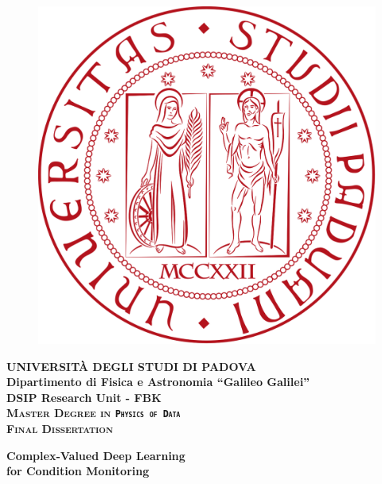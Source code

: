 \documentclass[../main.tex]{subfiles}
\begin{document}
	\begin{titlepage}
		\vspace{5mm}
		\begin{figure}[hbtp]
			\centering
			\includegraphics[scale=.13]{../pictures/frontespizio/UNIPD}
		\end{figure}
		\vspace{5mm}
		\begin{center}
			{{\huge{\textsc{\bf UNIVERSIT\`A DEGLI STUDI DI PADOVA}}}\\}
			\vspace{5mm}
			{\Large{\bf Dipartimento di Fisica e Astronomia ``Galileo Galilei''}} \\
			\vspace{5mm}
			{\Large{\bf DSIP Research Unit - FBK}} \\
			\vspace{5mm}
			{\Large{\textsc{\bf Master Degree in \texttt{Physics of Data}}}}\\
			\vspace{10mm}
			{\Large{\textsc{\bf Final Dissertation}}}\\
			\begin{spacing}{3}
				{\huge\textbf{Complex-Valued Deep Learning \\for Condition Monitoring}}\\
			\end{spacing}
		\end{center}
	

\end{titlepage}
\end{document}
